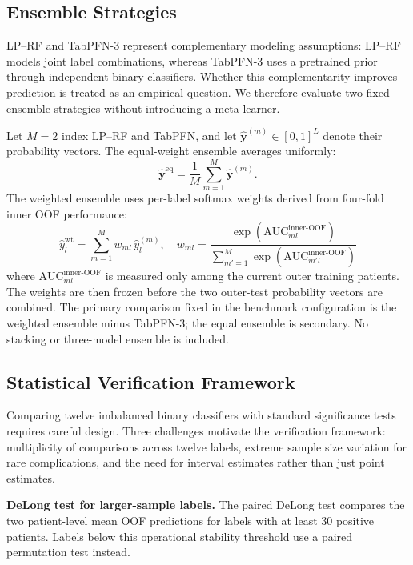 \documentclass{ieeeaccess}
\begin{document}
\subsection{Ensemble Strategies}

LP--RF and TabPFN-3 represent complementary modeling assumptions: LP--RF models joint label combinations, whereas TabPFN-3 uses a pretrained prior through independent binary classifiers. Whether this complementarity improves prediction is treated as an empirical question. We therefore evaluate two fixed ensemble strategies without introducing a meta-learner.

Let $M=2$ index LP--RF and TabPFN, and let $\hat{\mathbf{y}}^{(m)} \in [0,1]^{L}$ denote their probability vectors. The equal-weight ensemble averages uniformly:
\begin{equation}
\hat{\mathbf{y}}^{\mathrm{eq}} = \frac{1}{M}\sum_{m=1}^{M}\hat{\mathbf{y}}^{(m)}.
\label{eq:eq_ensemble}
\end{equation}
The weighted ensemble uses per-label softmax weights derived from four-fold inner OOF performance:
\begin{equation}
\hat{y}_l^{\mathrm{wt}} = \sum_{m=1}^{M} w_{ml}\,\hat{y}_l^{(m)}, \quad
w_{ml} = \frac{\exp(\mathrm{AUC}_{ml}^{\mathrm{inner\mbox{-}OOF}})}{\sum_{m'=1}^{M}\exp(\mathrm{AUC}_{m'l}^{\mathrm{inner\mbox{-}OOF}})}
\label{eq:wt_ensemble}
\end{equation}
where $\mathrm{AUC}_{ml}^{\mathrm{inner\mbox{-}OOF}}$ is measured only among the current outer training patients. The weights are then frozen before the two outer-test probability vectors are combined. The primary comparison fixed in the benchmark configuration is the weighted ensemble minus TabPFN-3; the equal ensemble is secondary. No stacking or three-model ensemble is included.

\subsection{Statistical Verification Framework}
\label{sec:statistical}

Comparing twelve imbalanced binary classifiers with standard significance tests requires careful design. Three challenges motivate the verification framework: multiplicity of comparisons across twelve labels, extreme sample size variation for rare complications, and the need for interval estimates rather than just point estimates.

\textbf{DeLong test for larger-sample labels.} The paired DeLong test \cite{delong1988} compares the two patient-level mean OOF predictions for labels with at least 30 positive patients. Labels below this operational stability threshold use a paired permutation test instead.
\end{document}
